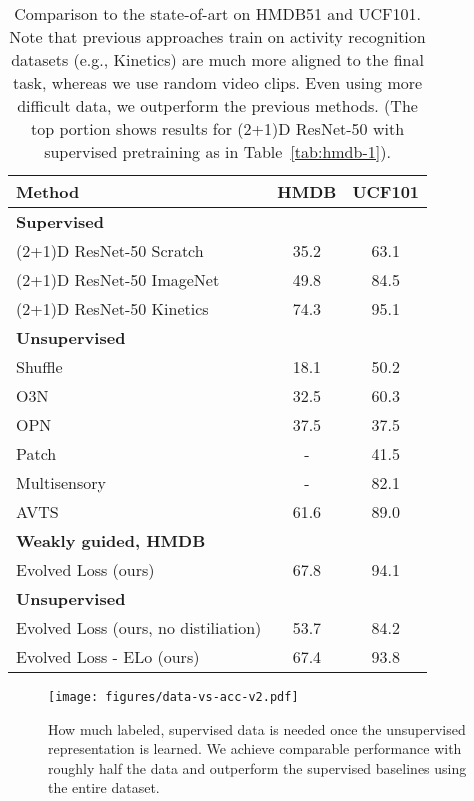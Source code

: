 \documentclass[10pt,twocolumn,letterpaper]{article}
\begin{document}
\begin{table}
    \centering
    \begin{tabular}{lcc}
    \toprule
    Method & HMDB & UCF101 \\
    \midrule
    \multicolumn{3}{l}{\textbf{Supervised}}\\
    (2+1)D ResNet-50 Scratch   & 35.2 & 63.1 \\
    (2+1)D ResNet-50 ImageNet & 49.8 & 84.5 \\
    (2+1)D ResNet-50 Kinetics & 74.3 & 95.1 \\
    \midrule
    \multicolumn{3}{l}{\textbf{Unsupervised}}\\
    Shuffle \cite{misra2016shuffle} & 18.1 & 50.2\\
    O3N \cite{fernando2017self}  & 32.5 & 60.3 \\
    OPN \cite{lee2017unsupervised} & 37.5 & 37.5 \\
    Patch \cite{wang2015unsupervised} & - & 41.5 \\
    Multisensory \cite{owens2018audio} & - & 82.1 \\
    AVTS \cite{korbar2018cooperative} & 61.6 & 89.0 \\
    \midrule
    \multicolumn{3}{l}{\textbf{Weakly guided, HMDB}}\\
    Evolved Loss (ours) & 67.8 & 94.1 \\
    \midrule
    \multicolumn{3}{l}{\textbf{Unsupervised}}\\
Evolved Loss (ours, no distiliation) &53.7 &84.2 \\
    Evolved Loss - ELo (ours) & 67.4 & 93.8 \\
    \bottomrule
    \end{tabular}
    \caption{Comparison to the state-of-art on HMDB51 and UCF101.  Note that previous approaches train on activity recognition datasets (e.g., Kinetics) are much more aligned to the final task, whereas we use random video clips. Even using more difficult data, we outperform the previous methods.
    (The top portion shows results for (2+1)D ResNet-50 with supervised pretraining as in Table~\ref{tab:hmdb-1}).}
    \label{tab:state-of-art}
\end{table}






\begin{figure}
    \centering
    \texttt{[image: figures/data-vs-acc-v2.pdf]}
\caption{How much labeled, supervised data is needed once the unsupervised representation is learned. We achieve comparable performance with roughly half the data and outperform the supervised baselines using the entire dataset.}
    \label{fig:amounts-of-labeled-data}
\end{figure}
\end{document}
